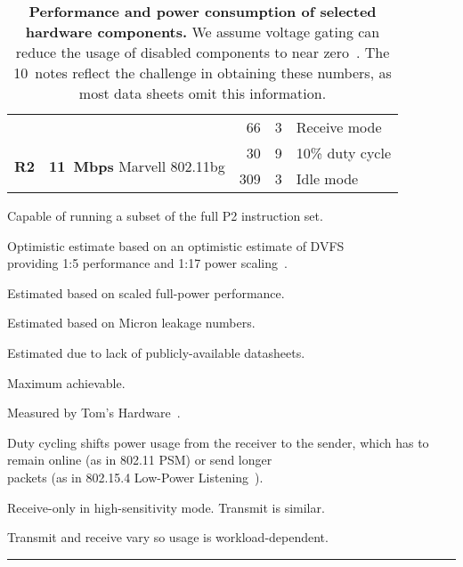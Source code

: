 \begin{table}[t]
\begin{threeparttable}
{\begin{tabularx}{\columnwidth}{p{0.05in}lr@{.}lX}
& &
66 & 3\tnote{9} &
Receive mode\tnote{9}
\\ \cmidrule(lr){2-5}

\multirow{2}{*}{\textbf{R2}} & \multirow{2}{*}{\textbf{11~Mbps} Marvell 802.11bg} &
30 & 9\tnote{3} &
10\% duty cycle\tnote{8}
\\

& &
309 & 3\tnote{10} &
Idle mode\tnote{10}
\\

\end{tabularx}
}
{\footnotesize
\begin{tablenotes}
\item [1] Capable of running a subset of the full P2 instruction set.
\item [2] Optimistic estimate based on an optimistic estimate of DVFS\\providing 1:5 performance and
1:17 power scaling~\cite{jssc02-PowerPC-SoC}.
\item [3] Estimated based on scaled full-power performance.
\item [4] Estimated based on Micron leakage numbers.
\item [5] Estimated due to lack of publicly-available datasheets.
\item [6] Maximum achievable.
\item [7] Measured by Tom's Hardware~\cite{ssd-tomshardware}.
\item [8] Duty cycling shifts power usage from the receiver to the sender,
which has to remain online (as in 802.11 PSM) or send longer\\packets (as in
802.15.4 Low-Power Listening~\cite{tinyos-lpl}).
\item [9] Receive-only in high-sensitivity mode. Transmit is similar.
\item [10] Transmit and receive vary so usage is workload-dependent.
\end{tablenotes}
}
\vspace*{-0.05in}
\caption{\textbf{Performance and power consumption of selected hardware
components.} We assume voltage gating can reduce the usage of disabled
components to near zero~\cite{islped-vdd-gate}. The 10~notes reflect the
challenge in obtaining these numbers, as most data sheets omit this
information.}
\end{threeparttable}
\label{table-components}
\vspace{0.10in}
\hrule
\vspace{-0.20in}
\end{table}
